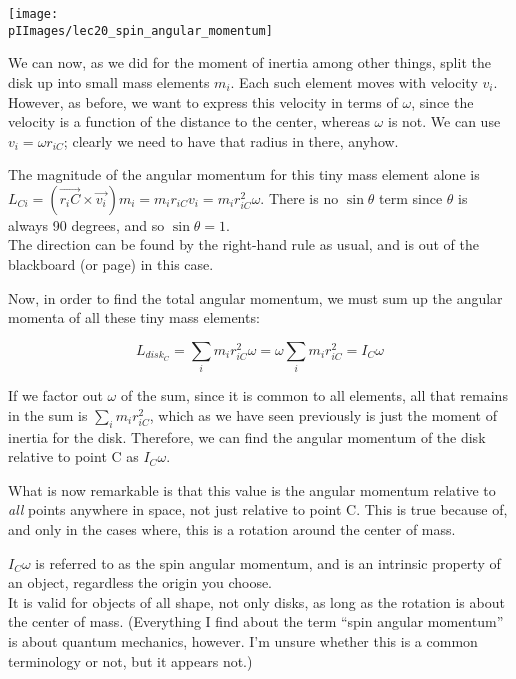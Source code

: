 \begin{center}
\texttt{[image: \\pIImages/lec20\_spin\_angular\_momentum]}
\end{center}

We can now, as we did for the moment of inertia among other things, split the disk up into small mass elements $m_i$. Each such element moves with velocity $v_i$. However, as before, we want to express this velocity in terms of $\omega$, since the velocity is a function of the distance to the center, whereas $\omega$ is not. We can use $v_i = \omega r_{iC}$; clearly we need to have that radius in there, anyhow.

The magnitude of the angular momentum for this tiny mass element alone is $L_{Ci} = (\vec{r_iC} \times \vec{v_i}) m_i = m_i r_{iC} v_i = m_i r_{iC}^2 \omega$. There is no $\sin \theta$ term since $\theta$ is always 90 degrees, and so $\sin \theta = 1$.\\
The direction can be found by the right-hand rule as usual, and is out of the blackboard (or page) in this case.

Now, in order to find the total angular momentum, we must sum up the angular momenta of all these tiny mass elements:

\begin{equation}
L_{disk_C} = \sum_i m_i r_{iC}^2 \omega = \omega \sum_i m_i r_{iC}^2 = I_C \omega
\end{equation}

If we factor out $\omega$ of the sum, since it is common to all elements, all that remains in the sum is $\sum_i m_i r_{iC}^2$, which as we have seen previously is just the moment of inertia for the disk. Therefore, we can find the angular momentum of the disk relative to point C as $I_C \omega$.

What is now remarkable is that this value is the angular momentum relative to \emph{all} points anywhere in space, not just relative to point C. This is true because of, and only in the cases where, this is a rotation around the center of mass.

$I_C \omega$ is referred to as the spin angular momentum, and is an intrinsic property of an object, regardless the origin you choose.\\
It is valid for objects of all shape, not only disks, as long as the rotation is about the center of mass.
(Everything I find about the term ``spin angular momentum'' is about quantum mechanics, however. I'm unsure whether this is a common terminology or not, but it appears not.)

